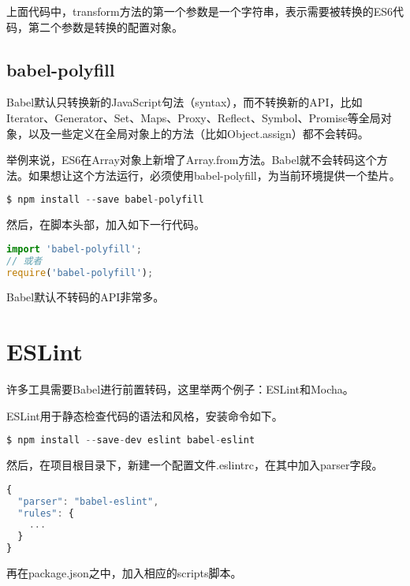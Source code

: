 上面代码中，transform方法的第一个参数是一个字符串，表示需要被转换的ES6代码，第二个参数是转换的配置对象。

\subsection{babel-polyfill}

Babel默认只转换新的JavaScript句法（syntax），而不转换新的API，比如Iterator、Generator、Set、Maps、Proxy、Reflect、Symbol、Promise等全局对象，以及一些定义在全局对象上的方法（比如Object.assign）都不会转码。

举例来说，ES6在Array对象上新增了Array.from方法。Babel就不会转码这个方法。如果想让这个方法运行，必须使用babel-polyfill，为当前环境提供一个垫片。

\begin{lstlisting}[language=JavaScript]
$ npm install --save babel-polyfill
\end{lstlisting}



然后，在脚本头部，加入如下一行代码。




\begin{lstlisting}[language=JavaScript]
import 'babel-polyfill';
// 或者
require('babel-polyfill');
\end{lstlisting}


Babel默认不转码的API非常多。


\section{ESLint}


许多工具需要Babel进行前置转码，这里举两个例子：ESLint和Mocha。

ESLint用于静态检查代码的语法和风格，安装命令如下。

\begin{lstlisting}[language=JavaScript]
$ npm install --save-dev eslint babel-eslint
\end{lstlisting}


然后，在项目根目录下，新建一个配置文件.eslintrc，在其中加入parser字段。






\begin{lstlisting}[language=JavaScript]
{
  "parser": "babel-eslint",
  "rules": {
    ...
  }
}
\end{lstlisting}

再在package.json之中，加入相应的scripts脚本。



